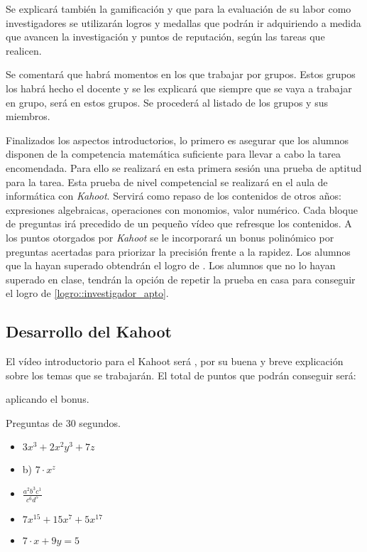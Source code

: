 Se explicará también la gamificación y que para la evaluación de su labor como investigadores se utilizarán logros y medallas que podrán ir adquiriendo a medida que avancen la investigación y puntos de reputación, según las tareas que realicen.

Se comentará que habrá momentos en los que trabajar por grupos.
%
Estos grupos los habrá hecho el docente  y se les explicará que siempre que se vaya a trabajar en grupo, será en estos grupos.
%
Se procederá al listado de los grupos y sus miembros.

Finalizados los aspectos introductorios, lo primero es asegurar que los alumnos disponen de la competencia matemática suficiente para llevar a cabo la tarea encomendada.
%
Para ello se realizará en esta primera sesión una prueba de aptitud para la tarea.
%
Esta prueba de nivel competencial se realizará en el aula de informática con \textit{Kahoot}.
%
Servirá como repaso de los contenidos de otros años: expresiones algebraicas, operaciones con monomios, valor numérico.
%
Cada bloque de preguntas irá precedido de un pequeño vídeo que refresque los contenidos.
%
A los puntos otorgados por \textit{Kahoot} se le incorporará un bonus polinómico por preguntas acertadas para priorizar la precisión frente a la rapidez.
%
Los alumnos que la hayan superado obtendrán el logro de .
%
Los alumnos que no lo hayan superado en clase, tendrán la opción de repetir la prueba en casa para conseguir el logro de \ref{logro::investigador_apto}.


\subsection{Desarrollo del Kahoot}

El vídeo introductorio para el Kahoot será \cite{VideoKahootSes1}, por su buena y breve explicación sobre los temas que se trabajarán.
%
%
El total de puntos que podrán conseguir será: 

aplicando el bonus.

\newbloq Preguntas de 30 segundos.


\begin{itemize}
\item {} $3x^3+2x^2y^3 + 7z$
\item b) $7·x^z$
\item {} $\frac{a^2b^3c^1}{c^6d^5}$
\item {} $7x^{15} + 15x^7 + 5x^{17}$
\item {} $7·x+9y = 5$
\end{itemize}


